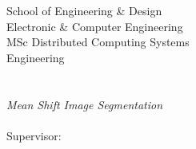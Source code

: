 \begin{titlepage}

		\begin{center}
        \large  
		\vspace*{1cm}
		{School of Engineering \& Design}\\
		{Electronic \& Computer Engineering}\\
		\vspace{1.2cm}
		{MSc Distributed Computing Systems}\\
		{Engineering}\\
		\vspace{2cm}
		\huge
		{\myUni}\\
		\vspace{2.5cm}
		\Huge
		\begingroup
			\color{Maroon}{\myTitle}\\
			\textit{\large{Mean Shift Image Segmentation}} \\
		\endgroup	
		\vspace{4.5cm}
		\large
		{\myName}\\
		\vspace{1cm}
		{Supervisor: \mySupervisor}\\
		\vspace{1cm}
		{\myTime}\\
		\normalsize
		\end{center}

\end{titlepage}        
